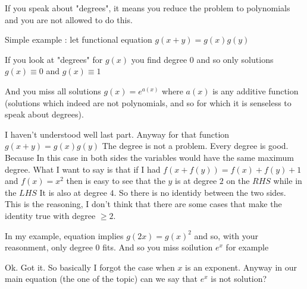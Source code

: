 \begin{solution}
	If you speak about "degrees", it means you reduce the problem to polynomials and you are not allowed to do this.

Simple example : let functional equation $g(x+y)=g(x)g(y)$

If you look at "degrees" for $g(x)$ you find degree $0$ and so only solutions $g(x)\equiv 0$ and $g(x)\equiv 1$

And you miss all solutions $g(x)=e^{a(x)}$ where $a(x)$ is any additive function
(solutions which indeed are not polynomials, and so for which it is senseless to speak about degrees).

\end{solution}



\begin{solution}
	I haven't understood well last part. Anyway for that function \(g(x+y)=g(x)g(y)\) The degree is not a problem. Every degree is good. Because In this case in both sides the variables would have the same maximum degree. What I want to say is that if I had \(f(x+f(y))=f(x)+f(y)+1\) and \(f(x)=x^2\) then is easy to see that the \(y\) is at degree \(2\) on the \(RHS\) while in the \(LHS\) It is also at degree \(4\). So there is no identidy between the two sides.
This is the reasoning, I don't think that there are some cases that make the identity true with degree \(\ge 2\).
\end{solution}



\begin{solution}
	In my example, equation implies $g(2x)=g(x)^2$ and so, with your reasonment, only degree $0$ fits. And so you miss soilution $e^x$ for example

\end{solution}



\begin{solution}
	Ok. Got it. So basically I forgot the case when \(x\) is an exponent. Anyway in our main equation (the one of the topic) can we say that \(e^x\) is not solution?
\end{solution}



